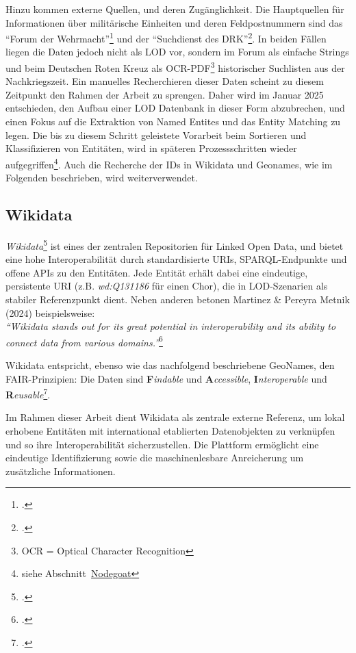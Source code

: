 \documentclass[12pt, a4paper, ngerman, bidi=default]{article}
\let\cite\footcite
\begin{document}
Hinzu kommen externe Quellen, und deren Zugänglichkeit. Die Hauptquellen für Informationen 
über militärische Einheiten und deren Feldpostnummern sind das \enquote{Forum der Wehrmacht}\cite[ vgl.][]{altenburger_lexikon_nodate} 
und der \enquote{Suchdienst des DRK}\cite[ vgl.][]{reuter_drk_2025}. In beiden Fällen liegen die Daten jedoch nicht als LOD vor, sondern im Forum als einfache Strings 
und beim Deutschen Roten Kreuz als OCR-PDF\footnote{OCR = Optical Character Recognition} historischer Suchlisten aus der Nachkriegszeit. Ein manuelles Recherchieren dieser Daten scheint zu diesem Zeitpunkt
den Rahmen der Arbeit zu sprengen. Daher wird im Januar 2025 entschieden, den Aufbau einer LOD Datenbank in dieser Form abzubrechen, und einen Fokus auf die Extraktion von Named Entites und das Entity Matching zu legen. Die bis zu diesem Schritt geleistete Vorarbeit beim Sortieren und Klassifizieren von Entitäten, wird in späteren Prozessschritten wieder aufgegriffen\footnote{siehe Abschnitt~\hyperref[subsec:Nodegoat_chapter]{Nodegoat}}. Auch die Recherche der IDs in Wikidata und Geonames, wie im Folgenden beschrieben, wird weiterverwendet. 

\subsection{Wikidata}\label{subsec:wikidata}

\textit{Wikidata}\cite[vgl.][]{noauthor_wikidata_nodate} ist eines der zentralen Repositorien für Linked Open Data, und bietet eine hohe Interoperabilität durch standardisierte
URIs, SPARQL-Endpunkte und offene APIs zu den Entitäten.
Jede Entität erhält dabei eine eindeutige, persistente URI 
(z.B. \colorbox{VeryLightGray}{\textit{wd:Q131186}} für einen Chor), die in LOD-Szenarien 
als stabiler Referenzpunkt dient.
Neben anderen betonen Martinez \& Pereyra Metnik (2024) beispielsweise: \\
\textit{\enquote{Wikidata stands out for its great potential in interoperability and its ability to connect data from various domains.}}\cite{martinez_comparative_nodate}

Wikidata entspricht, ebenso wie das nachfolgend beschriebene GeoNames, den FAIR-Prinzipien: Die Daten sind 
\textbf{F}\textit{indable} und \textbf{A}\textit{ccessible}, \textbf{I}\textit{nteroperable} und \textbf{R}\textit{eusable}\cite[ vgl.][S. 2]{wilkinson_fair_2016}.

Im Rahmen dieser Arbeit dient Wikidata als zentrale externe Referenz, um lokal erhobene Entitäten mit international etablierten Datenobjekten 
zu verknüpfen und so ihre Interoperabilität sicherzustellen. Die Plattform ermöglicht eine eindeutige Identifizierung sowie die maschinenlesbare 
Anreicherung um zusätzliche Informationen.
\end{document}
